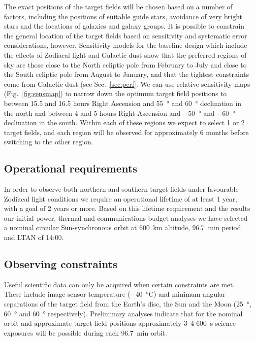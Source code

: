 \documentclass[]{iac}
\begin{document}
The exact positions of the target fields will be chosen based on a number of factors, including the positions of
suitable guide stars, avoidance of very bright stars and the locations of galaxies and galaxy groups. It is possible to
constrain the general location of the target fields based on sensitivity and systematic error considerations, however.
Sensitivity models for the baseline design which include the effects of Zodiacal light and Galactic dust show that the
preferred regions of sky are those close to the North ecliptic pole from February to July and close to the South
ecliptic pole from August to January, and that the tightest constraints come from Galactic dust (see
Sec.~\ref{sec:perf}. We can use relative sensitivity maps (Fig.~\ref{fig:sensmap}) to narrow down the optimum target
field positions to between 15.5 and 16.5 hours Right Ascension and \SI{+55}{\degree} and \SI{+60}{\degree}
declination in the north and between 4 and 5 hours Right Ascension and \SI{-50}{\degree} and \SI{-60}{\degree}
declination in the south. Within each of these regions we
expect to select 1 or 2 target fields, and each region will be observed for approximately 6 months before switching to
the other region.

\subsection{Operational requirements}

In order to observe both northern and southern target fields under favourable Zodiacal light conditions we require an
operational lifetime of at least 1 year, with a goal of 2 years or more. Based on this lifetime requirement and the
results our initial power, thermal and communications budget analyses we have selected a nominal circular
Sun-synchronous orbit at \SI{600}{\kilo\metre} altitude, \SI{96.7}{\minute} period and LTAN of 14:00.

\subsection{Observing constraints}
\label{sec:obsconst}

Useful scientific data can only be acquired when certain constraints are met. These include image sensor temperature
(\SI{-40}{\celsius}) and minimum angular separations of the target field from the Earth's disc, the Sun and the Moon
(\SI{25}{\degree}, \SI{60}{\degree} and \SI{60}{\degree} respectively). Preliminary analyses indicate that for the
nominal orbit and approximate target field positions approximately 3--4 \SI{600}{\second} science exposures will be
possible during each \SI{96.7}{\minute} orbit.
\end{document}
